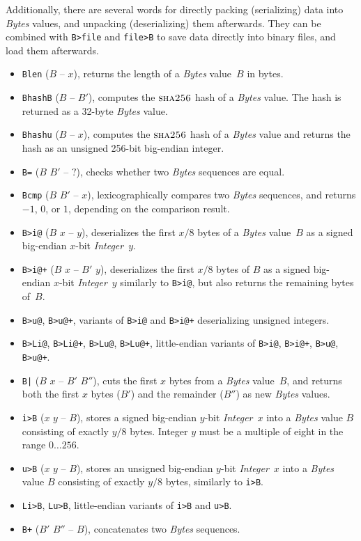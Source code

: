 \documentclass[12pt,oneside]{article}
\def\opsc#1{\operatorname{\textsc{#1}}}
\def\Sha{\opsc{sha256}}
\begin{document}
Additionally, there are several words for directly packing (serializing) data into {\em Bytes\/} values, and unpacking (deserializing) them afterwards. They can be combined with {\tt B>file} and {\tt file>B} to save data directly into binary files, and load them afterwards.
\begin{itemize}
\item {\tt Blen} ($B$ -- $x$), returns the length of a {\em Bytes\/} value~$B$ in bytes.
\item {\tt BhashB} ($B$ -- $B'$), computes the $\Sha$ hash of a {\em Bytes\/} value. The hash is returned as a 32-byte {\em Bytes\/} value.
\item {\tt Bhashu} ($B$ -- $x$), computes the $\Sha$ hash of a {\em Bytes\/} value and returns the hash as an unsigned 256-bit big-endian integer.
\item {\tt B=} ($B$ $B'$ -- $?$), checks whether two {\em Bytes\/} sequences are equal.
\item {\tt Bcmp} ($B$ $B'$ -- $x$), lexicographically compares two {\em Bytes\/} sequences, and returns $-1$, $0$, or $1$, depending on the comparison result.
\item {\tt B>i@} ($B$ $x$ -- $y$), deserializes the first $x/8$ bytes of a {\em Bytes} value~$B$ as a signed big-endian $x$-bit {\em Integer}~$y$.
\item {\tt B>i@+} ($B$ $x$ -- $B'$ $y$), deserializes the first $x/8$ bytes of $B$ as a signed big-endian $x$-bit {\em Integer}~$y$ similarly to {\tt B>i@}, but also returns the remaining bytes of~$B$.
\item {\tt B>u@}, {\tt B>u@+}, variants of {\tt B>i@} and {\tt B>i@+} deserializing unsigned integers.
\item {\tt B>Li@}, {\tt B>Li@+}, {\tt B>Lu@}, {\tt B>Lu@+}, little-endian variants of {\tt B>i@}, {\tt B>i@+}, {\tt B>u@}, {\tt B>u@+}.
\item {\tt B|} ($B$ $x$ -- $B'$ $B''$), cuts the first $x$ bytes from a {\em Bytes} value~$B$, and returns both the first $x$ bytes ($B'$) and the remainder ($B''$) as new {\em Bytes} values.
\item {\tt i>B} ($x$ $y$ -- $B$), stores a signed big-endian $y$-bit {\em Integer}~$x$ into a {\em Bytes} value $B$ consisting of exactly $y/8$ bytes. Integer $y$ must be a multiple of eight in the range $0\ldots256$.
\item {\tt u>B} ($x$ $y$ -- $B$), stores an unsigned big-endian $y$-bit {\em Integer}~$x$ into a {\em Bytes} value $B$ consisting of exactly $y/8$ bytes, similarly to {\tt i>B}.
\item {\tt Li>B}, {\tt Lu>B}, little-endian variants of {\tt i>B} and {\tt u>B}.
\item {\tt B+} ($B'$ $B''$ -- $B$), concatenates two {\em Bytes\/} sequences.
\end{itemize}
\end{document}
